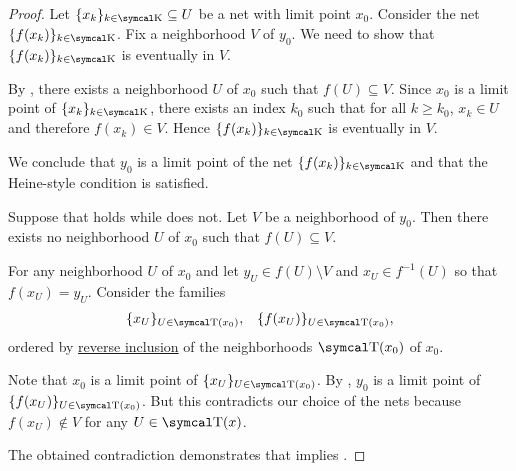 \begin{proof}
   Let \( \{ x_k \}_{k \in \CK} \subseteq U \) be a net  with limit point \( x_0 \). Consider the net \( \{ f(x_k) \}_{k \in \CK} \). Fix a neighborhood \( V \) of \( y_0 \). We need to show that \( \{ f(x_k) \}_{k \in \CK} \) is eventually in \( V \).

  By , there exists a neighborhood \( U \) of \( x_0 \) such that \( f(U) \subseteq V \). Since \( x_0 \) is a limit point of \( \{ x_k \}_{k \in \CK} \), there exists an index \( k_0 \) such that for all \( k \geq k_0 \), \( x_k \in U \) and therefore \( f(x_k) \in V \). Hence \( \{ f(x_k) \}_{k \in \CK} \) is eventually in \( V \).

  We conclude that \( y_0 \) is a limit point of the net \( \{ f(x_k) \}_{k \in \CK} \) and that the Heine-style condition is satisfied.

   Suppose that  holds while  does not\LEM. Let \( V \) be a neighborhood of \( y_0 \). Then there exists no neighborhood \( U \) of \( x_0 \) such that \( f(U) \subseteq V \).

  For any neighborhood \( U \) of \( x_0 \) and let \( y_U \in f(U) \setminus V \) and \( x_U \in f^{-1} (U) \) so that \( f(x_U) = y_U \). Consider the families
  \begin{align*}
    \{ x_U \}_{U \in \CT(x_0)},
     &  &
    \{ f(x_U) \}_{U \in \CT(x_0)},
  \end{align*}
  ordered by \hyperref[ex:reverse_inclusion_net]{reverse inclusion} of the neighborhoods \( \CT(x_0) \) of \( x_0 \).

  Note that \( x_0 \) is a limit point of \( \{ x_U \}_{U \in \CT(x_0)} \). By , \( y_0 \) is a limit point of \( \{ f(x_U) \}_{U \in \CT(x_0)} \). But this contradicts our choice of the nets because \( f(x_U) \not\in V \) for any \( U \in \CT(x) \).

  The obtained contradiction demonstrates that  implies .
\end{proof}

